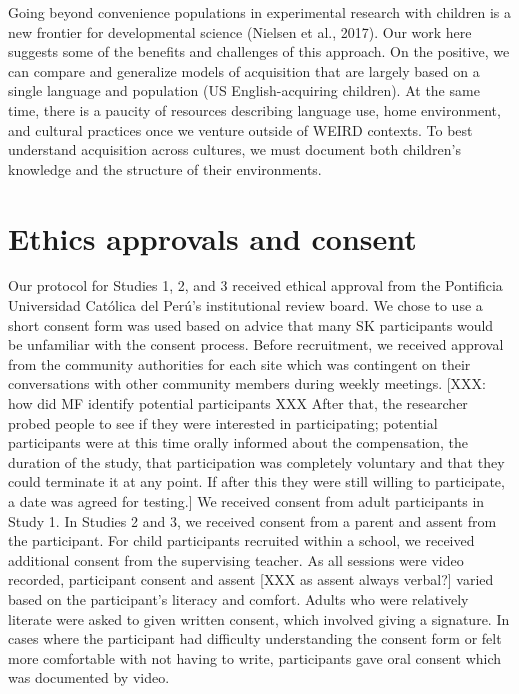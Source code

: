 \documentclass[
  ,apa7,floatsintext]{apa6}
\begin{document}
Going beyond convenience populations in experimental research with children is a new frontier for developmental science (Nielsen et al., 2017). Our work here suggests some of the benefits and challenges of this approach. On the positive, we can compare and generalize models of acquisition that are largely based on a single language and population (US English-acquiring children). At the same time, there is a paucity of resources describing language use, home environment, and cultural practices once we venture outside of WEIRD contexts. To best understand acquisition across cultures, we must document both children's knowledge and the structure of their environments.

\hypertarget{ethics-approvals-and-consent}{%
\section{Ethics approvals and consent}\label{ethics-approvals-and-consent}}

Our protocol for Studies 1, 2, and 3 received ethical approval from the Pontificia Universidad Católica del Perú's institutional review board. We chose to use a short consent form was used based on advice that many SK participants would be unfamiliar with the consent process. Before recruitment, we received approval from the community authorities for each site which was contingent on their conversations with other community members during weekly meetings. {[}XXX: how did MF identify potential participants XXX After that, the researcher probed people to see if they were interested in participating; potential participants were at this time orally informed about the compensation, the duration of the study, that participation was completely voluntary and that they could terminate it at any point. If after this they were still willing to participate, a date was agreed for testing.{]} We received consent from adult participants in Study 1. In Studies 2 and 3, we received consent from a parent and assent from the participant. For child participants recruited within a school, we received additional consent from the supervising teacher. As all sessions were video recorded, participant consent and assent {[}XXX as assent always verbal?{]} varied based on the participant's literacy and comfort. Adults who were relatively literate were asked to given written consent, which involved giving a signature. In cases where the participant had difficulty understanding the consent form or felt more comfortable with not having to write, participants gave oral consent which was documented by video.
\end{document}
